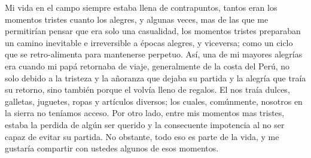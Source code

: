 Mi vida en el campo siempre estaba llena de contrapuntos, tantos eran los momentos tristes cuanto los alegres, y  algunas veces, mas de las que me permitirían pensar que era solo una casualidad, los momentos tristes preparaban un camino inevitable e irreversible a épocas alegres, y viceversa; como un ciclo que se retro-alimenta para mantenerse perpetuo.
Así, una de mi mayores alegrías era cuando mi papá retornaba de viaje, generalmente de la costa del Perú, no solo debido a la tristeza y la añoranza que dejaba su partida y la alegría que traía su retorno, sino también porque el volvía lleno de regalos. 
El nos traía dulces, galletas, juguetes, ropas y artículos diversos; los cuales, comúnmente, nosotros en la sierra no teníamos acceso.
Por otro lado, entre mis momentos mas tristes, estaba la perdida de algún ser querido y la consecuente impotencia al no ser capaz de evitar su partida.
No obstante, todo eso es parte de la vida, y me gustaría compartir con ustedes algunos de esos momentos.





